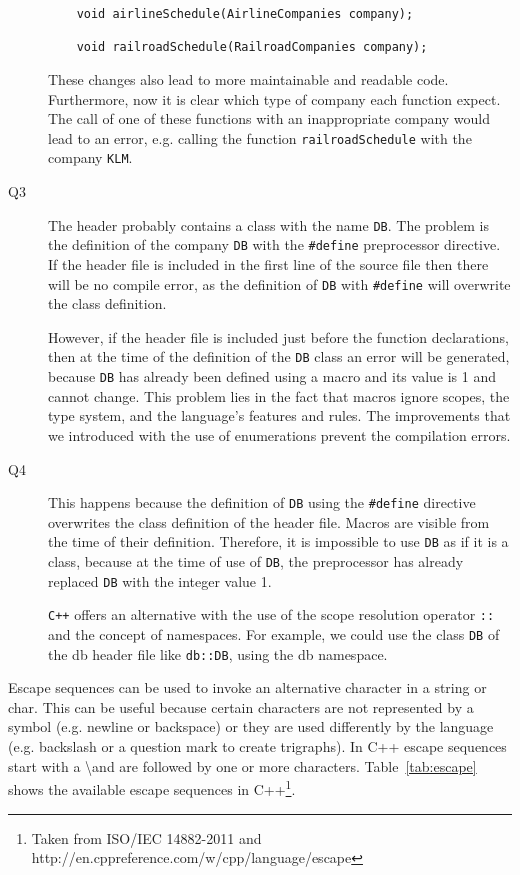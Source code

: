 \documentclass[a4paper]{article}
\newcounter{exerciseCount}
\newcommand{\exercise}[1]{\addtocounter{exerciseCount}{1} \noindent \medskip {\large \textsf{\textbf{Exercise \arabic{exerciseCount} #1}}} \par}
\begin{document}
\begin{description}
	\begin{verbatim}
	void airlineSchedule(AirlineCompanies company);
	
	void railroadSchedule(RailroadCompanies company);
	\end{verbatim}
	
	These changes also lead to more maintainable and readable code. Furthermore, now it is clear which type of company each function expect. The call of one of these functions with an inappropriate company would lead to an error, e.g. calling the function \verb|railroadSchedule| with the company \verb|KLM|.
	\item[Q3]\-
	The header probably contains a class with the name \verb|DB|. The problem is the definition of the company \verb|DB| with the \verb|#define| preprocessor directive. If the header file is included in the first line of the source file then there will be no compile error, as the definition of \verb|DB| with \verb|#define| will overwrite the class definition.
	
	However, if the header file is included just before the function declarations, then at the time of the definition of the \verb|DB| class an error will be generated, because \verb|DB| has already been defined using a macro and its value is 1 and cannot change. This problem lies in the fact that macros ignore scopes, the type system, and the language's features and rules. The improvements that we introduced with the use of enumerations prevent the compilation errors.
	\item[Q4]\-
	This happens because the definition of \verb|DB| using the \verb|#define| directive overwrites the class definition of the header file. Macros are visible from the time of their definition. Therefore, it is impossible to use \verb|DB| as if it is a class, because at the time of use of \verb|DB|, the preprocessor has already replaced \verb|DB| with the integer value 1.
	
	\verb|C++| offers an alternative with the use of the scope resolution operator \verb|::| and the concept of namespaces. For example, we could use the class \verb|DB| of the db header file like \verb|db::DB|, using the db namespace.
\end{description}

\exercise{}

Escape sequences can be used to invoke an alternative character in a string or char. This can be useful because certain characters are not represented by a symbol (e.g. newline or backspace) or they are used differently by the language (e.g. backslash or a question mark to create trigraphs).  In C++ escape sequences start with a \textbackslash  and are followed by one or more characters. Table~\ref{tab:escape} shows the available escape sequences in C++\footnote{Taken from ISO/IEC 14882-2011 and http://en.cppreference.com/w/cpp/language/escape}.
\end{document}

